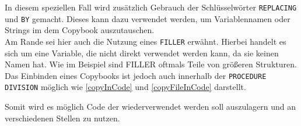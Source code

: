 In diesem speziellen Fall wird zusätzlich Gebrauch der Schlüsselwörter \texttt{REPLACING} und \texttt{BY} gemacht. Dieses kann dazu verwendet werden, um Variablennamen oder Strings im dem Copybook auszutauschen.\\

Am Rande sei hier auch die Nutzung eines \texttt{FILLER} erwähnt. Hierbei handelt es sich um eine Variable, die nicht direkt verwendet werden kann, da sie keinen Namen hat. Wie im Beispiel sind FILLER oftmals Teile von größeren Strukturen.\\

Das Einbinden eines Copybooks ist jedoch auch innerhalb der \texttt{PROCEDURE DIVISION} möglich wie \autoref{copyInCode} und \autoref{copyFileInCode} darstellt.\\



Somit wird es möglich Code der wiederverwendet werden soll auszulagern und an verschiedenen Stellen zu nutzen.\\